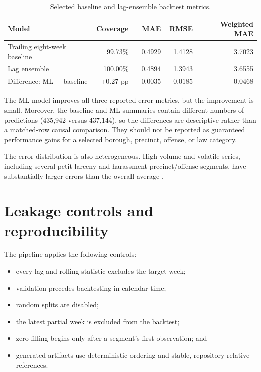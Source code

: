\documentclass[11pt,oneside]{report}
\begin{document}
\begin{table}[htbp]
  \centering
  \caption{Selected baseline and lag-ensemble backtest metrics.}
  \label{tab:model-comparison}
  \begin{tabular}{lrrrr}
    \toprule
    \textbf{Model} & \textbf{Coverage} & \textbf{MAE} & \textbf{RMSE} & \textbf{Weighted MAE} \\
    \midrule
    Trailing eight-week baseline & 99.73\% & 0.4929 & 1.4128 & 3.7023 \\
    Lag ensemble & 100.00\% & 0.4894 & 1.3943 & 3.6555 \\
    \midrule
    Difference: ML $-$ baseline & +0.27 pp & $-0.0035$ & $-0.0185$ & $-0.0468$ \\
    \bottomrule
  \end{tabular}
\end{table}

The ML model improves all three reported error metrics, but the improvement is
small. Moreover, the baseline and ML summaries contain different numbers of
predictions (435,942 versus 437,144), so the differences are descriptive rather
than a matched-row causal comparison. They should not be reported as guaranteed
performance gains for a selected borough, precinct, offense, or law category.

The error distribution is also heterogeneous. High-volume and volatile series,
including several petit larceny and harassment precinct/offense segments, have
substantially larger errors than the overall average \cite{mlreport}.

\section{Leakage controls and reproducibility}

The pipeline applies the following controls:

\begin{itemize}
  \item every lag and rolling statistic excludes the target week;
  \item validation precedes backtesting in calendar time;
  \item random splits are disabled;
  \item the latest partial week is excluded from the backtest;
  \item zero filling begins only after a segment's first observation; and
  \item generated artifacts use deterministic ordering and stable,
    repository-relative references.
\end{itemize}
\end{document}
